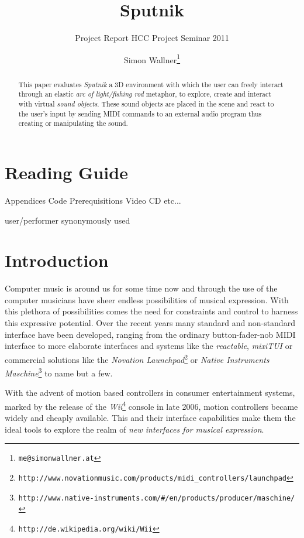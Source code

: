 \documentclass[10pt,a4paper]{scrartcl}
\title{Sputnik}
\subtitle{Project Report HCC Project Seminar 2011}
\author{Simon Wallner\footnote{\texttt{me@simonwallner.at}}}
\begin{document}
\maketitle

\begin{abstract}
This paper evaluates \emph{Sputnik} a 3D environment with which the user can freely interact through an elastic \emph{arc of light/fishing rod} metaphor, to explore, create and interact with virtual \emph{sound objects}. These sound objects are placed in the scene and react to the user's input by sending MIDI commands to an external audio program thus creating or manipulating the sound.

\end{abstract}

\section{Reading Guide}
Appendices
Code
Prerequisitions
Video
CD
etc...

user/performer synonymously used


\section{Introduction}

Computer music is around us for some time now and through the use of the computer musicians have sheer endless possibilities of musical expression. With this plethora of possibilities comes the need for constraints and control to harness this expressive potential. Over the recent years many standard and non-standard interface have been developed, ranging from the ordinary button-fader-nob MIDI interface to more elaborate interfaces and systems like the \emph{reactable}\cite{Jorda2007}, \emph{mixiTUI}\cite{Pedersen2009} or commercial solutions like the \emph{Novation Launchpad}\footnote{\texttt{http://www.novationmusic.com/products/midi\_controllers/launchpad}} or \emph{Native Instruments Maschine}\footnote{\texttt{http://www.native-instruments.com/\#/en/products/producer/maschine/}} to name but a few.

With the advent of motion based controllers in consumer entertainment systems, marked by the release of the \emph{Wii}\footnote{\texttt{http://de.wikipedia.org/wiki/Wii}} console in late 2006, motion controllers became widely and cheaply available. This and their interface capabilities make them the ideal tools to explore the realm of \emph{new interfaces for musical expression}.
\end{document}
